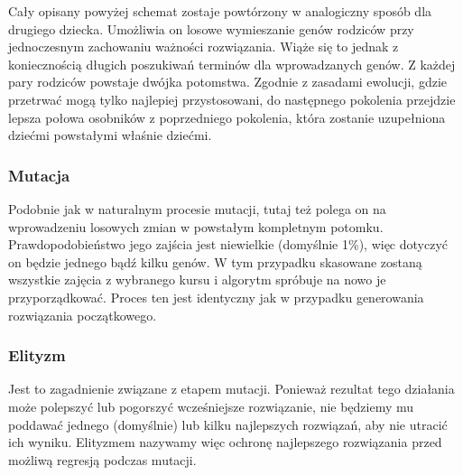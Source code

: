 \par Cały opisany powyżej schemat zostaje powtórzony w analogiczny sposób dla drugiego dziecka. Umożliwia on losowe wymieszanie genów rodziców przy jednoczesnym zachowaniu ważności rozwiązania. Wiąże się to jednak z koniecznością długich poszukiwań terminów dla wprowadzanych genów. Z każdej pary rodziców powstaje dwójka potomstwa. Zgodnie z zasadami ewolucji, gdzie przetrwać mogą tylko najlepiej przystosowani, do następnego pokolenia przejdzie lepsza połowa osobników z poprzedniego pokolenia, która zostanie uzupełniona dziećmi powstałymi właśnie dziećmi.
\subsubsection{Mutacja}
Podobnie jak w naturalnym procesie mutacji, tutaj też polega on na wprowadzeniu losowych zmian w powstałym kompletnym potomku. Prawdopodobieństwo jego zajścia jest niewielkie (domyślnie 1\%), więc dotyczyć on będzie jednego bądź kilku genów. W tym przypadku skasowane zostaną wszystkie zajęcia z wybranego kursu i algorytm spróbuje na nowo je przyporządkować. Proces ten jest identyczny jak w przypadku generowania rozwiązania początkowego.
\subsubsection{Elityzm}
\par Jest to zagadnienie związane z etapem mutacji. Ponieważ rezultat tego działania może polepszyć lub pogorszyć wcześniejsze rozwiązanie, nie będziemy mu poddawać jednego (domyślnie) lub kilku najlepszych rozwiązań, aby nie utracić ich wyniku. Elityzmem nazywamy więc ochronę najlepszego rozwiązania przed możliwą regresją podczas mutacji.

